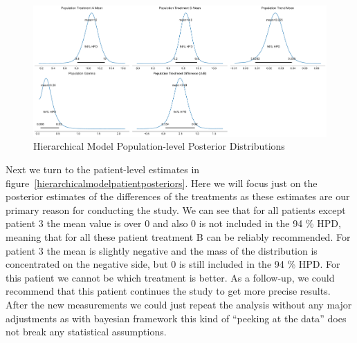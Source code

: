 \documentclass[12pt,a4paper,leqno]{report}
\theoremstyle{plain}
\theoremstyle{definition}
\theoremstyle{remark}
\begin{document}
\bigskip
\begin{figure}[H]
    \caption{Hierarchical Model Population-level Posterior Distributions}\label{hierarchicalmodelpopulationposteriors}
    \bigskip
    \includegraphics[width=\textwidth,height=\textheight,keepaspectratio]{hierarchical_model_population_level_posteriors.pdf}
\end{figure}
\bigskip

Next we turn to the patient-level estimates in figure\
\ref{hierarchicalmodelpatientposteriors}. Here we will focus just on the
posterior estimates of the differences of the treatments as these estimates are our
primary reason for conducting the study. We can see that for all patients except patient 3
the mean value is over 0 and also 0 is not included in the 94 \% HPD, meaning that for
all these patient treatment B can be reliably recommended. For patient 3 the mean is
slightly negative and the mass of the distribution is concentrated on the negative side, but 0
is still included in the 94 \% HPD. For this patient we cannot be which
treatment is better. As a follow-up, we could recommend that this patient continues the
study to get more precise results. After the new measurements we could just repeat the
analysis without any major adjustments as with bayesian framework this kind of
``peeking at the data'' does not break any statistical assumptions.
\end{document}
